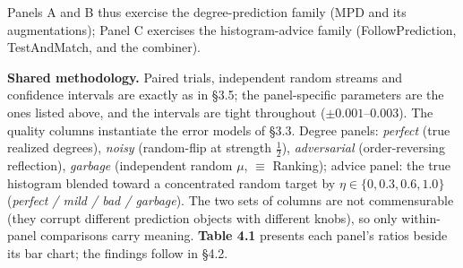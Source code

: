 Panels A and B thus exercise the degree-prediction family (MPD and its
augmentations); Panel C exercises the histogram-advice family
(FollowPrediction, TestAndMatch, and the combiner).

\textbf{Shared methodology.} Paired trials, independent random streams
and confidence intervals are exactly as in §3.5; the panel-specific
parameters are the ones listed above, and the intervals are tight
throughout (\(\pm0.001\)--\(0.003\)). The quality columns instantiate
the error models of §3.3. Degree panels: \emph{perfect} (true realized
degrees), \emph{noisy} (random-flip at strength \(\tfrac12\)),
\emph{adversarial} (order-reversing reflection), \emph{garbage}
(independent random \(\mu\), \(\equiv\) Ranking); advice panel: the true
histogram blended toward a concentrated random target by
\(\eta\in\{0,0.3,0.6,1.0\}\) (\emph{perfect / mild / bad / garbage}).
The two sets of columns are not commensurable (they corrupt different
prediction objects with different knobs), so only within-panel
comparisons carry meaning. \textbf{Table 4.1} presents each panel's
ratios beside its bar chart; the findings follow in §4.2.

